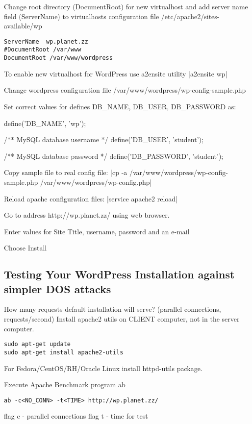 Change root directory (DocumentRoot) for new virtualhost and add server name field (ServerName) to virtualhosts configuration file   /etc/apache2/sites-available/wp


\begin{verbatim}
ServerName	wp.planet.zz
#DocumentRoot /var/www
DocumentRoot /var/www/wordpress
\end{verbatim}


To enable new virtualhost for WordPress use a2ensite utility
|a2ensite wp|

Change wordpress configuration file
/var/www/wordpress/wp-config-sample.php

Set correct values for defines DB\_NAME, DB\_USER, DB\_PASSWORD as:

define('DB\_NAME', 'wp');

/** MySQL database username */
define('DB\_USER', 'student');

/** MySQL database password */
define('DB\_PASSWORD', 'student');


Copy sample file to real config file:
|cp  -a /var/www/wordpress/wp-config-sample.php /var/www/wordpress/wp-config.php|

Reload apache configuration files:
|service  apache2 reload|

Go to address http://wp.planet.zz/ using web browser.

Enter values for  Site Title, username, password and an e-mail

Choose Install

\subsection{Testing Your WordPress Installation against simpler DOS attacks}


How many requests default installation will serve? (parallel connections, requests/second)
Install apache2 utils on CLIENT computer, not in the server computer.

\begin{verbatim}
sudo apt-get update
sudo apt-get install apache2-utils
\end{verbatim}

For Fedora/CentOS/RH/Oracle Linux install httpd-utils package.

Execute Apache Benchmark program ab
\begin{verbatim}
ab -c<NO_CONN> -t<TIME> http://wp.planet.zz/
\end{verbatim}
flag c - parallel connections
flag t - time for test

